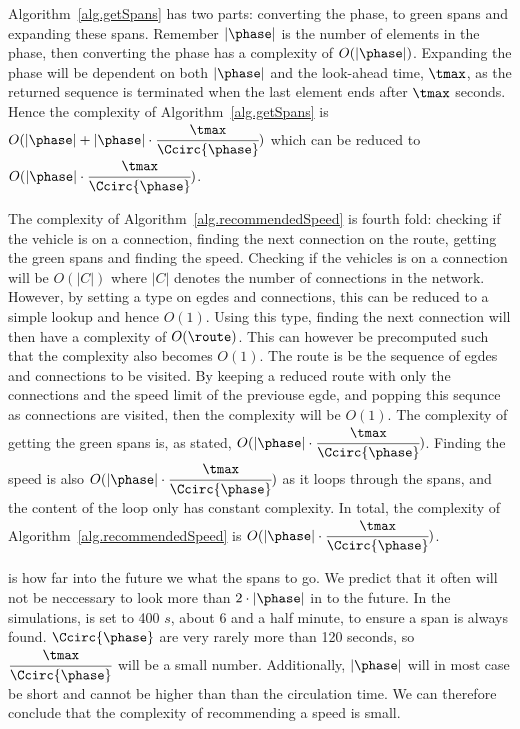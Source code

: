 Algorithm~\ref{alg.getSpans} has two parts: converting the phase, \phase to green spans and expanding these spans.
Remember $|\phase|$ is the number of elements in the phase, then converting the phase has a complexity of $O(|\phase|)$.
Expanding the phase will be dependent on both $|\phase|$ and the look-ahead time, $\tmax$, as the returned sequence is terminated when the last element ends after $\tmax$ seconds.
Hence the complexity of Algorithm~\ref{alg.getSpans} is  $O(|\phase|+ |\phase|\cdot \cfrac{\tmax}{\Ccirc{\phase}})$ which can be reduced to $O(|\phase|\cdot \cfrac{\tmax}{\Ccirc{\phase}})$.

The complexity of Algorithm~\ref{alg.recommendedSpeed} is fourth fold: checking if the vehicle is on a connection, finding the next connection on the route, getting the green spans and finding the speed.
Checking if the vehicles is on a connection will be $O(|C|)$ where $|C|$ denotes the number of connections in the network.
However, by setting a type on egdes and connections, this can be reduced to a simple lookup and hence $O(1)$.
Using this type, finding the next connection will then have a complexity of $O(\route)$.
This can however be precomputed such that the complexity also becomes $O(1)$.
The route is be the sequence of egdes and connections to be visited.
By keeping a reduced route with only the connections and the speed limit of the previouse egde, and popping this sequnce as connections are visited, then the complexity will be $O(1)$.
The complexity of getting the green spans is, as stated, $O(|\phase|\cdot \cfrac{\tmax}{\Ccirc{\phase}})$.
Finding the speed is also $O(|\phase|\cdot \cfrac{\tmax}{\Ccirc{\phase}})$ as it loops through the spans, and the content of the loop only has constant complexity.
In total, the complexity of Algorithm~\ref{alg.recommendedSpeed} is $O(|\phase|\cdot \cfrac{\tmax}{\Ccirc{\phase}})$.

\tmax is how far into the future we what the spans to go.
We predict that it often will not be neccessary to look more than $2\cdot |\phase|$ in to the future.
In the simulations, \tmax is set to 400 $s$, about 6 and a half minute, to ensure a span is always found.
$\Ccirc{\phase}$ are very rarely more than 120 seconds, so $\cfrac{\tmax}{\Ccirc{\phase}}$ will be a small number.
Additionally, $|\phase|$ will in most case be short and cannot be higher than than the circulation time.
We can therefore conclude that the complexity of recommending a speed is small.

